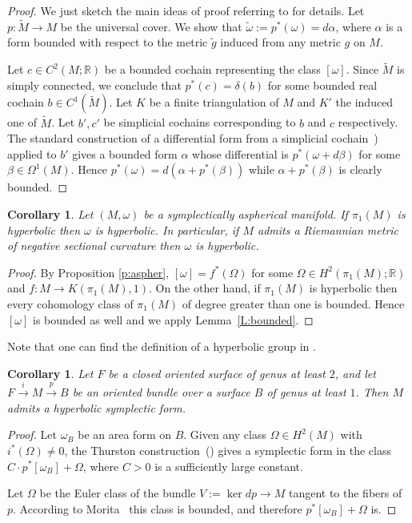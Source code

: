 \documentclass[12pt]{amsart}
\newcommand{\B}[1]{{\mathbb #1}}
\newcommand\R{\B R}
\newtheorem{corollary}[subsection]{Corollary}
\numberwithin{equation}{section}
\theoremstyle{definition}
\theoremstyle{remark}
\newcommand\lemref{Lemma~\ref}
\numberwithin{figure}{section}
\numberwithin{table}{section}
\newcommand{\al}{{\alpha}}
\newcommand{\Om}{{\Omega}}
\newcommand{\om}{{\omega}}
\newcommand{\Mo}{(M,\omega )}
\begin{document}
\begin{proof} 
We just sketch the main ideas of  proof referring to 
 \cite[Theorem 2.1]{K} for details. 
Let $p:\widetilde M \to M$ be the universal cover. 
We show that $\widetilde \om :=p^*(\om)=d\alpha$, 
where $\al$ is a form bounded with respect to 
the metric $\widetilde g$ induced from any metric $g$ 
on $M$. 
 
Let $c\in C^2(M;\R)$ be a bounded cochain representing 
the class $[\om]$. Since $\widetilde M$ is simply connected,  
we conclude that $p^*(c)= \delta (b)$ for some 
bounded real cochain $b\in C^1(\widetilde M)$.  
Let $K$ be a finite triangulation 
of $M$ and $K'$ the induced one of $\widetilde M$. Let  
$b',c'$ be simplicial cochains corresponding to $b$ and  
$c$ respectively. 
The standard construction of a differential form from a  
simplicial cochain~\cite[pages 148--149]{STh}) applied to $b'$ gives a 
bounded form $\al$ whose differential is $p^*(\om+d\beta)$ for 
some $\beta\in \Om^1(M)$. Hence $p^*(\om)=d(\al + p^*(\beta))$ while 
$\al+p^*(\beta)$ is clearly bounded. 
\end{proof} 
 

\begin{corollary}\label{C:hyperbolic} 
Let $\Mo$ be a symplectically aspherical manifold.  
If $\pi_1(M)$ is hyperbolic then $\om$ 
is hyperbolic.  
In particular, if $M$ admits a Riemannian 
metric of negative sectional curvature then $\om $ is 
hyperbolic.  
\end{corollary} 

\begin{proof} 
By Proposition \ref{p:aspher}, 
$[\om]=f^*(\Om)$ for some $\Om\in H^2(\pi_1(M);\B R)$ and $f:M\to 
K(\pi_1(M),1)$.  
On the other hand, if 
$\pi_1(M)$ is hyperbolic then every cohomology class  
of $\pi_1(M)$ of degree greater than one is bounded.  
Hence $[\om]$ is bounded as well and we apply \lemref{L:bounded}. 
\end{proof} 
 Note that one can find the  definition of a hyperbolic group in \cite{Gr}.
\begin{corollary} 
Let $F$ be a closed oriented surface of genus at least $2$, 
and let $F\stackrel i\to M\stackrel p\to B$ be an oriented bundle over a  
surface $B$ of genus at least $1$. 
Then $M$ admits a hyperbolic symplectic form. 
\end{corollary} 
 
\begin{proof} 
Let $\om_B$ be an area form on $B$. Given any class $\Om\in H^2(M)$ 
with $i^*(\Om)\neq 0$, the Thurston construction~(\cite[Theorem 6.3]{MS1}) 
gives a symplectic form in the class $C\cdot p^*[\om_B]+ \Om$, where 
$C>0$ is a sufficiently large constant. 
 
Let $\Om$ be the Euler class of the 
bundle $V:=\ker dp \to M$ tangent to the fibers of $p$. 
According to Morita~\cite{Mo} this class is bounded, and therefore  
$p^*[\om_B]+\Om$ is. 
\end{proof} 
 
\end{document}
